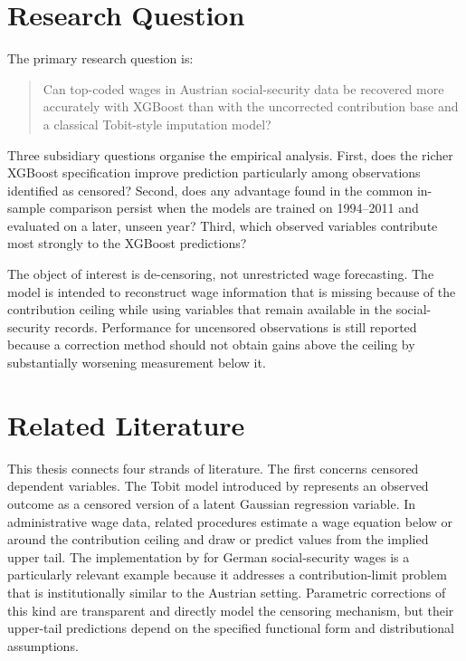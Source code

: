 \documentclass[12pt,a4paper,oneside,titlepage]{book}
\begin{document}
\section{Research Question}
The primary research question is:

\begin{quote}
Can top-coded wages in Austrian social-security data be recovered more accurately with XGBoost than with the uncorrected contribution base and a classical Tobit-style imputation model?
\end{quote}

Three subsidiary questions organise the empirical analysis. First, does the richer XGBoost specification improve prediction particularly among observations identified as censored? Second, does any advantage found in the common in-sample comparison persist when the models are trained on 1994--2011 and evaluated on a later, unseen year? Third, which observed variables contribute most strongly to the XGBoost predictions?

The object of interest is de-censoring, not unrestricted wage forecasting. The model is intended to reconstruct wage information that is missing because of the contribution ceiling while using variables that remain available in the social-security records. Performance for uncensored observations is still reported because a correction method should not obtain gains above the ceiling by substantially worsening measurement below it.

\section{Related Literature}
This thesis connects four strands of literature. The first concerns censored dependent variables. The Tobit model introduced by \citet{tobin1958} represents an observed outcome as a censored version of a latent Gaussian regression variable. In administrative wage data, related procedures estimate a wage equation below or around the contribution ceiling and draw or predict values from the implied upper tail. The implementation by \citet{gartner2005} for German social-security wages is a particularly relevant example because it addresses a contribution-limit problem that is institutionally similar to the Austrian setting. Parametric corrections of this kind are transparent and directly model the censoring mechanism, but their upper-tail predictions depend on the specified functional form and distributional assumptions.
\end{document}
